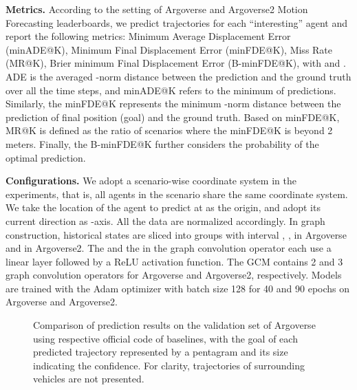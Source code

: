 \documentclass[letterpaper, 10 pt, conference]{ieeeconf}
\begin{document}
\textbf{Metrics.} According to the setting of Argoverse and Argoverse2 Motion Forecasting leaderboards, we predict  trajectories for each ``interesting'' agent and report the following metrics: Minimum Average Displacement Error (minADE@K), Minimum Final Displacement Error (minFDE@K), Miss Rate (MR@K), Brier minimum Final Displacement Error (B-minFDE@K), with  and . ADE is the averaged -norm distance between the prediction and the ground truth over all the time steps, and minADE@K refers to the minimum  of  predictions.  Similarly, the minFDE@K represents the minimum -norm distance between the prediction  of final position (goal) and the  ground truth. Based on minFDE@K, MR@K is defined as the ratio of scenarios where the minFDE@K is beyond 2 meters. Finally, the B-minFDE@K further considers the probability of the optimal prediction. 


\textbf{Configurations.}
We adopt a scenario-wise coordinate system in the experiments, that is, all agents in the scenario share the same coordinate system.   We take the location of the agent to predict at  as the origin, and adopt its current direction as -axis. All the data are normalized accordingly. In graph construction, historical states  are sliced into  groups with interval , ,  in Argoverse and  in Argoverse2. The  and the  in the graph convolution operator each use a linear layer followed by a ReLU activation function.
The GCM contains 2 and 3 graph convolution operators for Argoverse and Argoverse2, respectively. 
Models are trained with the Adam \cite{kingma2014adam} optimizer with batch size 128 for 40 and 90 epochs on Argoverse and Argoverse2.

\begin{figure*}[tp]
\renewcommand{\baselinestretch}{1.0}
\renewcommand{\abovecaptionskip}{0pt}
\vskip 0.2in
 \caption{Comparison of prediction results on the validation set of Argoverse using respective official code of baselines, with the goal of each predicted trajectory  represented by a pentagram and its size indicating the confidence.
 For clarity, trajectories of surrounding vehicles are not presented. } \label{fig.comp}
\end{figure*}
\end{document}
